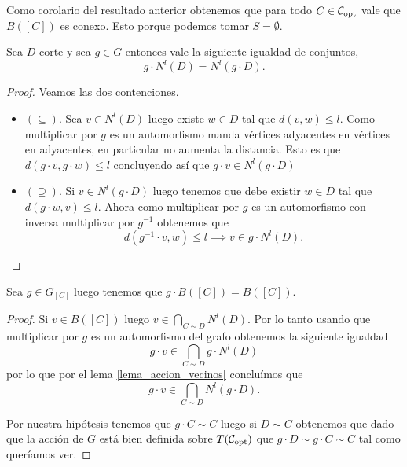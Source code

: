 \documentclass[tesis.tex]{subfiles}
\begin{document}
\begin{obs}
	Como corolario del resultado anterior obtenemos que para todo $C \in {\cal C}_{\text{opt}}$ vale que $B([C])$ es conexo.
	Esto porque podemos tomar $S = \emptyset$.
\end{obs}

\begin{lema}\label{lema_accion_vecinos}
	Sea $D$ corte y sea $g \in G$ entonces vale la siguiente igualdad de conjuntos,
	\[
		g \cdot N^l(D) = N^l(g \cdot D).
	\]
\end{lema}

\begin{proof}
	Veamos las dos contenciones.
	
	\begin{itemize}
		\item $(\subseteq)$. 
		Sea $v \in N^l(D)$ luego existe $w \in D$ tal que $d(v,w) \le l$.
		Como multiplicar por $g$ es un automorfismo manda vértices adyacentes en vértices en adyacentes, en particular no aumenta la distancia.
		Esto es que $d(g\cdot v,g\cdot w) \le l$ concluyendo así que $g \cdot v \in N^l(g \cdot D)$  
		\item $(\supseteq)$.
		Si $v \in N^l(g\cdot D)$ luego tenemos que debe existir $w \in D$ tal que $d(g \cdot w, v) \le l$.
		Ahora como multiplicar por $g$ es un automorfismo con inversa multiplicar por $g^{-1}$ obtenemos que 
		\[
			d(g^{-1} \cdot v, w) \le l \implies v \in g\cdot N^l(D).
		\]
	\end{itemize}
\end{proof}

\begin{lema}\label{lema_g_actua_b(C)}
	Sea $g \in G_{[C]}$ luego tenemos que $g \cdot B([C]) = B([C])$.
\end{lema}
\begin{proof}
	Si $v \in B([C])$ luego $v \in \bigcap_{C \sim D} N^l(D)$.
	Por lo tanto usando que multiplicar por $g$ es un automorfismo del grafo obtenemos la siguiente igualdad
	\[
		g\cdot v \in \bigcap_{C \sim D} g \cdot N^l(D)
	\]
	por lo que por el lema \ref{lema_accion_vecinos} concluímos que 
	\[
		g\cdot v \in \bigcap_{C \sim D}   N^l(g\cdot D).
	\]	
	
	Por nuestra hipótesis tenemos que $g \cdot C \sim C$ luego si $D \sim C$ obtenemos que dado que la acción de $G$ está bien definida sobre $T({\cal C}_{\text{opt}})$ que $g\cdot D \sim g\cdot C \sim C$ tal como queríamos ver.		
	
\end{proof}
\end{document}
